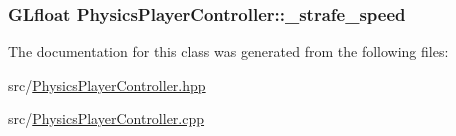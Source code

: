 \subsubsection[{\texorpdfstring{\+\_\+strafe\+\_\+speed}{_strafe_speed}}]{\setlength{\rightskip}{0pt plus 5cm}G\+Lfloat Physics\+Player\+Controller\+::\+\_\+strafe\+\_\+speed\hspace{0.3cm}{\ttfamily [private]}}\hypertarget{classPhysicsPlayerController_a0650942e3b59e8598ab70d649d9823a9}{}\label{classPhysicsPlayerController_a0650942e3b59e8598ab70d649d9823a9}


The documentation for this class was generated from the following files\+:\begin{DoxyCompactItemize}
\item 
src/\hyperlink{PhysicsPlayerController_8hpp}{Physics\+Player\+Controller.\+hpp}\item 
src/\hyperlink{PhysicsPlayerController_8cpp}{Physics\+Player\+Controller.\+cpp}\end{DoxyCompactItemize}
